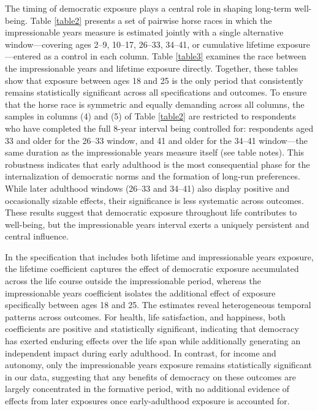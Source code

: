 \documentclass[11pt]{article}
\begin{document}
The timing of democratic exposure plays a central role in shaping long-term well-being. Table \ref{table2} presents a set of pairwise horse races in which the impressionable years measure is estimated jointly with a single alternative window---covering ages 2--9, 10--17, 26--33, 34--41, or cumulative lifetime exposure---entered as a control in each column. Table \ref{table3} examines the race between the impressionable years and lifetime exposure directly. Together, these tables show that exposure between ages 18 and 25 is the only period that consistently remains statistically significant across all specifications and outcomes. To ensure that the horse race is symmetric and equally demanding across all columns, the samples in columns (4) and (5) of Table \ref{table2} are restricted to respondents who have completed the full 8-year interval being controlled for: respondents aged 33 and older for the 26--33 window, and 41 and older for the 34--41 window---the same duration as the impressionable years measure itself (see table notes). This robustness indicates that early adulthood is the most consequential phase for the internalization of democratic norms and the formation of long-run preferences. While later adulthood windows (26--33 and 34--41) also display positive and occasionally sizable effects, their significance is less systematic across outcomes. These results suggest that democratic exposure throughout life contributes to well-being, but the impressionable years interval exerts a uniquely persistent and central influence.

In the specification that includes both lifetime and impressionable years exposure, the lifetime coefficient captures the effect of democratic exposure accumulated across the life course outside the impressionable period, whereas the impressionable years coefficient isolates the additional effect of exposure specifically between ages 18 and 25. The estimates reveal heterogeneous temporal patterns across outcomes. For health, life satisfaction, and happiness, both coefficients are positive and statistically significant, indicating that democracy has exerted enduring effects over the life span while additionally generating an independent impact during early adulthood. In contrast, for income and autonomy, only the impressionable years exposure remains statistically significant in our data, suggesting that any benefits of democracy on these outcomes are largely concentrated in the formative period, with no additional evidence of effects from later exposures once early-adulthood exposure is accounted for.
\end{document}
